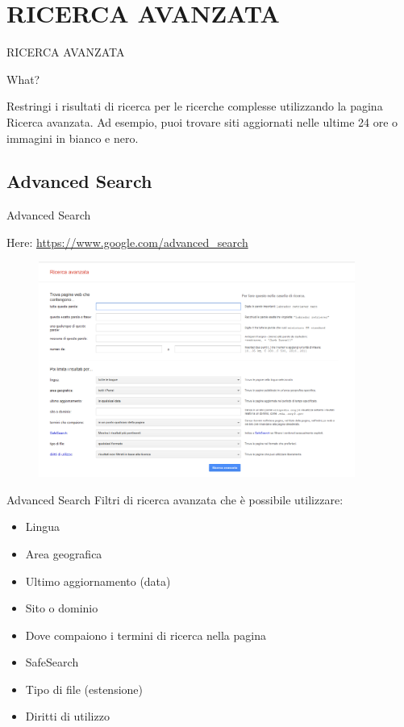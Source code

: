 \documentclass{beamer}
\begin{document}
\section{RICERCA AVANZATA}
\begin{frame}{RICERCA AVANZATA}
\begin{block}{\begin{center}What?\end{center}}
Restringi i risultati di ricerca per le ricerche complesse utilizzando la pagina Ricerca avanzata. Ad esempio, puoi trovare siti aggiornati nelle ultime 24 ore o immagini in bianco e nero.
\end{block}
\end{frame}

\subsection{Advanced Search}
\begin{frame}{Advanced Search}
\begin{center}Here: 
\footnotesize
\textcolor{blue}{\href{https://www.google.com/advanced_search}{https://www.google.com/advanced\_search}}
\begin{figure}[h!]
\includegraphics[height=200pt]{immagini/advancedsearch.png}
\end{figure}
\end{center}
\end{frame}
\begin{frame}{Advanced Search}
Filtri di ricerca avanzata che è possibile utilizzare:
\begin{itemize}
\item    Lingua
\item    Area geografica
\item    Ultimo aggiornamento (data)
\item    Sito o dominio
\item    Dove compaiono i termini di ricerca nella pagina
\item    SafeSearch
\item    Tipo di file (estensione)
\item    Diritti di utilizzo
\end{itemize}
\end{frame}
\end{document}
